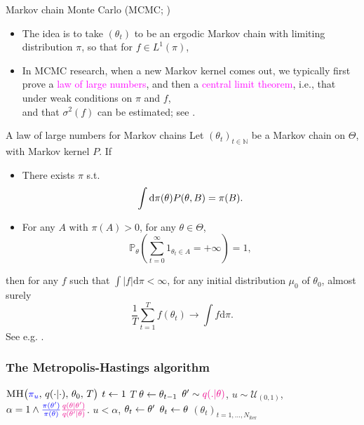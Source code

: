 \documentclass[10pt]{beamer}
\let\oldcitep=\citep
\renewcommand\citep[1]{\hyperlink{#1}{\textcolor{vert}{\oldcitep{#1}}}}
\renewcommand\un[1]{\textcolor{magenta}{#1}}
\renewcommand\unn[1]{\textcolor{blue}{#1}}
\begin{document}
\begin{frame}{Markov chain Monte Carlo (MCMC; \citep{RoCa04})}
\begin{itemize}
  \item The idea is to take $(\theta_t)$ to be an ergodic Markov chain with limiting distribution $\pi$, so that for $f\in L^1(\pi)$,
  $$$$
  \vfill
  \item In MCMC research, when a new Markov kernel comes out, we typically first prove a \un{law of large numbers}, and then a \un{central limit theorem}, i.e., that under weak conditions on $\pi$ and $f$,
  $$$$
  \vfill
  and that $\sigma^2(f)$ can be estimated; see \citep{DoMoSt14}.
  \end{itemize}
\end{frame}

\begin{frame}{A law of large numbers for Markov chains}
  Let $(\theta_t)_{t\in\mathbb N}$ be a Markov chain on $\Theta$, with Markov kernel $P$. If
  \begin{itemize}
    \item There exists $\pi$ s.t. 
    $$
    \int {\rm d}\pi(\theta) P(\theta, B) = \pi(B).
    $$
    \item For any $A$ with $\pi(A)>0$, for any $\theta\in \Theta$,
    $$ 
    \mathbb{P}_{\theta} \left(\sum_{t=0}^\infty 1_{\theta_t\in A} = +\infty\right) = 1,
    $$
  \end{itemize}
  then for any $f$ such that $\int \vert f\vert \mathrm{d} \pi <\infty$, for any initial distribution $\mu_0$ of $\theta_0$, almost surely
  $$
  \frac{1}{T} \sum_{t=1}^T f(\theta_t) \rightarrow \int f\mathrm{d}\pi.
  $$
  See e.g. \citep{DoMoSt14}.
\end{frame}

\begin{frame}
\frametitle{The Metropolis-Hastings algorithm}
\begin{algorithm}{$\Algo{MH}\big(\unn{\pi_u},\, q(\cdot\vert\cdot),\,\theta_{0},\, T\big)$}
\Aitem \For $t\leftarrow1$ \To $T$
\Aitem \mt $\theta\leftarrow\theta_{t-1}$
\Aitem \mt $\theta'\sim \un{q(.\vert\theta)}$, $u\sim\mathcal U_{(0,1)}$,
\Aitem \mt $\alpha =  1\wedge \unn{\frac{\pi(\theta')}{\pi(\theta)}} \un{\frac{q(\theta\vert\theta')}{q(\theta'\vert\theta)}}$.
\Aitem \mt \If $u<\alpha$,
\Aitem \mtt $\theta_{t}\leftarrow\theta'$
\mt \algoremark{\unn{Accept}}
\Aitem \mt \Else $\theta_{t}\leftarrow\theta$
\mt \algoremark{\unn{Reject}} \label{ai:acceptanceEnd}
\Aitem
\Return $(\theta_{t})_{t=1,\dots,N_{\text{iter}}}$
\end{algorithm}
\end{frame}
\end{document}
